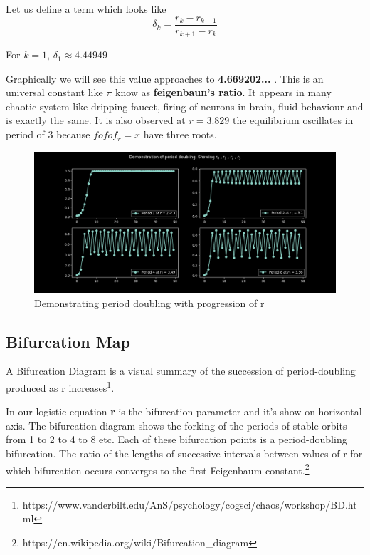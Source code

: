 \documentclass{report}
\begin{document}
Let us define a term which looks like
\begin{equation}
    \delta_k = \frac{r_k - r_{k-1}}{r_{k+1} - r_k}
\end{equation}

For $k = 1$, $\delta_1 \approx 4.44949$ \newline

Graphically we will see this value approaches to \textbf{4.669202...} . This is an universal constant like $\pi$ know as \textbf{feigenbaun's ratio}. It appears in many chaotic system like dripping faucet, firing of neurons in brain, fluid behaviour and is exactly the same.
It is also observed at $r = 3.829$ the equilibrium oscillates in period of 3 because $fofof_r = x$ have three roots. \newline

\begin{figure}[!h]
    \centering
    \includegraphics[scale=.45]{images/period2ing.png}
    \caption{Demonstrating period doubling with progression of r}
    \label{fig:my_label3}
\end{figure}

\subsection{Bifurcation Map}
\raggedright
A Bifurcation Diagram is a visual summary of the succession of period-doubling produced as r increases\footnote[1]{https://www.vanderbilt.edu/AnS/psychology/cogsci/chaos/workshop/BD.html}.

In our logistic equation \textbf{r} is the bifurcation parameter and it's show on horizontal axis. The bifurcation diagram shows the forking of the periods of stable orbits from 1 to 2 to 4 to 8 etc. Each of these bifurcation points is a period-doubling bifurcation. The ratio of the lengths of successive intervals between values of r for which bifurcation occurs converges to the first Feigenbaum constant.\footnote[2]{https://en.wikipedia.org/wiki/Bifurcation\_diagram}
\end{document}
